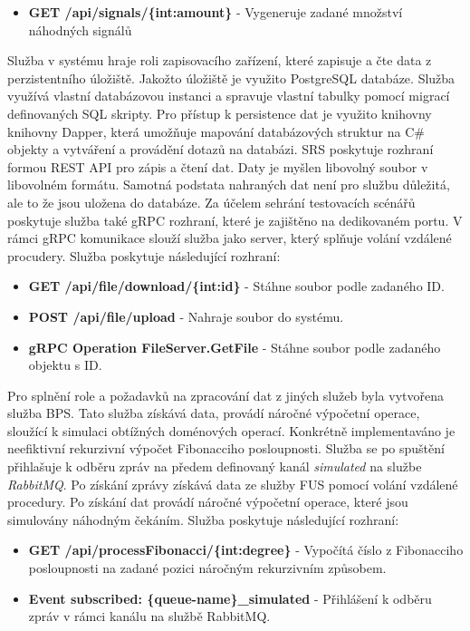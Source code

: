 \begin{itemize}
    \item \textbf{GET /api/signals/\{int:amount\}} - Vygeneruje zadané množství náhodných signálů
\end{itemize}


Služba v systému hraje roli zapisovacího zařízení, které zapisuje a čte data z perzistentního úložiště. Jakožto úložiště je využito PostgreSQL databáze. Služba využívá vlastní databázovou instanci a spravuje vlastní tabulky pomocí migrací definovaných SQL skripty. Pro přístup k persistence dat je využito knihovny knihovny Dapper, která umožňuje mapování databázových struktur na C\# objekty a vytváření a provádění dotazů na databázi. SRS poskytuje rozhraní formou REST API pro zápis a čtení dat. Daty je myšlen libovolný soubor v libovolném formátu. Samotná podstata nahraných dat není pro službu důležitá, ale to že jsou uložena do databáze. Za účelem sehrání testovacích scénářů poskytuje služba také gRPC rozhraní, které je zajištěno na dedikovaném portu. V rámci gRPC komunikace slouží služba jako server, který splňuje volání vzdálené procudery. Služba poskytuje následující rozhraní:

\begin{itemize}
    \item \textbf{GET /api/file/download/\{int:id\}} - Stáhne soubor podle zadaného ID.
    \item \textbf{POST /api/file/upload} - Nahraje soubor do systému.
    \item \textbf{gRPC Operation FileServer.GetFile} - Stáhne soubor podle zadaného objektu s ID.
\end{itemize}


Pro splnění role a požadavků na zpracování dat z jiných služeb byla vytvořena služba BPS. Tato služba získává data, provádí náročné výpočetní operace, sloužící k simulaci obtížných doménových operací. Konkrétně implementaváno je neefiktivní rekurzivní výpočet Fibonacciho posloupnosti. Služba se po spuštění přihlašuje k odběru zpráv na předem definovaný kanál \emph{simulated} na službe \emph{RabbitMQ}. Po získání zprávy získává data ze služby FUS pomocí volání vzdálené procedury. Po získání dat provádí náročné výpočetní operace, které jsou simulovány náhodným čekáním. Služba poskytuje následující rozhraní:

\begin{itemize}
    \item \textbf{GET /api/processFibonacci/\{int:degree\}} - Vypočítá číslo z Fibonacciho posloupnosti na zadané pozici náročným rekurzivním způsobem.
    \item \textbf{Event subscribed: \{queue-name\}\_simulated} - Přihlášení k odběru zpráv v rámci kanálu na službě RabbitMQ.
\end{itemize}

